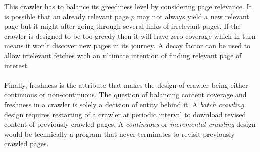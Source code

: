 \noindent
This crawler has to balance its greediness level by considering page relevance. It is possible that an already relevant page $p$ may not always yield a new relevant page but it might after going through
several links of irrelevant pages. If the crawler is designed to be too greedy then it will have zero
coverage which in turn means it won't discover new pages in its journey. A decay factor can be used to
allow irrelevant fetches with an ultimate intention of finding relevant page of interest.
\\
\\
Finally, freshness is the attribute that makes the design of crawler being either continuous or non-continuous. The question of balancing content coverage and freshness in a crawler is solely a decision of entity behind it. A \textit{batch crawling}\cite{trends} design requires restarting of a crawler at periodic interval to download revised content of previously crawled pages. A \textit{continuous} or \textit{incremental crawling}\cite{trends} design
would be technically a program that never terminates to revisit previously crawled pages.


